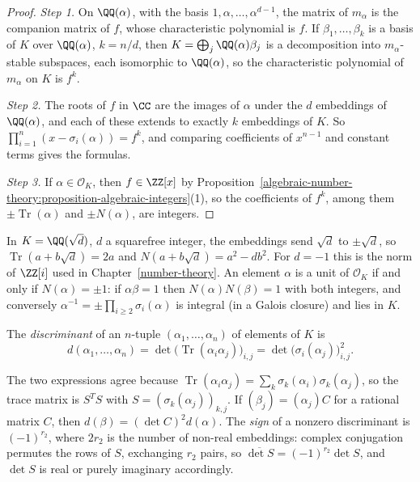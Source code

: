 \begin{proof}
\emph{Step 1.} On $\QQ(\alpha)$, with the basis $1, \alpha, \dots, \alpha^{d-1}$, the matrix of $m_\alpha$ is the companion matrix of $f$, whose characteristic polynomial is $f$. If
$\beta_1, \dots, \beta_k$ is a basis of $K$ over $\QQ(\alpha)$, $k = n/d$, then $K = \bigoplus_j\QQ(\alpha)\beta_j$ is a decomposition into $m_\alpha$-stable subspaces, each isomorphic to $\QQ(\alpha)$, so the
characteristic polynomial of $m_\alpha$ on $K$ is $f^k$.

\emph{Step 2.} The roots of $f$ in $\CC$ are the images of $\alpha$ under the $d$ embeddings of $\QQ(\alpha)$, and each of these extends to exactly $k$ embeddings of $K$. So
$\prod_{i=1}^n(x - \sigma_i(\alpha)) = f^k$, and comparing coefficients of $x^{n-1}$ and constant terms gives the formulas.

\emph{Step 3.} If $\alpha \in \mathcal{O}_K$, then $f \in \ZZ[x]$ by Proposition~\ref{algebraic-number-theory:proposition-algebraic-integers}(1), so the coefficients of $f^k$, among them $\pm\operatorname{Tr}(\alpha)$ and $\pm N(\alpha)$, are integers.
\end{proof}

\begin{example}\label{algebraic-number-theory:example-trace-norm}
In $K = \QQ(\sqrt d)$, $d$ a squarefree integer, the embeddings send $\sqrt d$ to $\pm\sqrt d$, so $\operatorname{Tr}(a + b\sqrt d) = 2a$ and $N(a + b\sqrt d) = a^2 - db^2$. For $d = -1$ this is the norm
of $\ZZ[i]$ used in Chapter~\ref{number-theory}. An element $\alpha$ is a unit of $\mathcal{O}_K$ if and only if $N(\alpha) = \pm1$: if $\alpha\beta = 1$ then $N(\alpha)N(\beta) = 1$ with both integers, and
conversely $\alpha^{-1} = \pm\prod_{i \geq 2}\sigma_i(\alpha)$ is integral (in a Galois closure) and lies in $K$.
\end{example}

\begin{definition}\label{algebraic-number-theory:definition-discriminant}
The \emph{discriminant} of an $n$-tuple $(\alpha_1, \dots, \alpha_n)$ of elements of $K$ is
\[
d(\alpha_1, \dots, \alpha_n) = \det\bigl(\operatorname{Tr}(\alpha_i\alpha_j)\bigr)_{i,j} = \det\bigl(\sigma_i(\alpha_j)\bigr)_{i,j}^2.
\]
\end{definition}

The two expressions agree because $\operatorname{Tr}(\alpha_i\alpha_j) = \sum_k\sigma_k(\alpha_i)\sigma_k(\alpha_j)$, so the trace matrix is $S^TS$ with $S = (\sigma_k(\alpha_j))_{k,j}$. If
$(\beta_j) = (\alpha_j)C$ for a rational matrix $C$, then $d(\beta) = (\det C)^2d(\alpha)$. The \emph{sign} of a nonzero discriminant is $(-1)^{r_2}$, where $2r_2$ is the number of non-real embeddings:
complex conjugation permutes the rows of $S$, exchanging $r_2$ pairs, so $\overline{\det S} = (-1)^{r_2}\det S$, and $\det S$ is real or purely imaginary accordingly.

